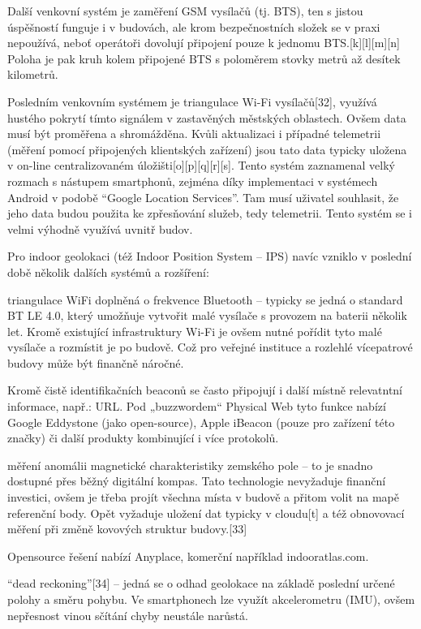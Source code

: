 Další venkovní systém je zaměření GSM vysílačů (tj. BTS), ten s jistou úspěšností funguje i v budovách, ale krom bezpečnostních složek se v praxi nepoužívá, neboť operátoři dovolují připojení pouze k jednomu BTS.[k][l][m][n] Poloha je pak kruh kolem připojené BTS s poloměrem stovky metrů až desítek kilometrů.

Posledním venkovním systémem je triangulace Wi-Fi vysílačů[32], využívá hustého pokrytí tímto signálem v zastavěných městských oblastech. Ovšem data musí být proměřena a shromážděna. Kvůli aktualizaci i případné telemetrii (měření pomocí připojených klientských zařízení) jsou tato data typicky uložena v on-line centralizovaném úložišti[o][p][q][r][s]. Tento systém zaznamenal velký rozmach s nástupem smartphonů, zejména díky implementaci v systémech Android v podobě “Google Location Services”. Tam musí uživatel souhlasit, že jeho data budou použita ke zpřesňování služeb, tedy telemetrii. Tento systém se i velmi výhodně využívá uvnitř budov.

Pro indoor geolokaci (též Indoor Position System – IPS) navíc vzniklo v poslední době několik dalších systémů a rozšíření:

triangulace WiFi doplněná o frekvence Bluetooth – typicky se jedná o standard BT LE 4.0, který umožňuje vytvořit malé vysílače s provozem na baterii několik let. Kromě existující infrastruktury Wi-Fi je ovšem nutné pořídit tyto malé vysílače a rozmístit je po budově. Což pro veřejné instituce a rozlehlé vícepatrové budovy může být finančně náročné. 



Kromě čistě identifikačních beaconů se často připojují i další místně relevatntní informace, např.: URL. Pod „buzzwordem“ Physical Web tyto funkce nabízí Google Eddystone (jako open-source), Apple iBeacon (pouze pro zařízení této značky) či další produkty kombinující i více protokolů.

měření anomálii magnetické charakteristiky zemského pole – to je snadno dostupné přes běžný digitální kompas. Tato technologie nevyžaduje finanční investici, ovšem je třeba projít všechna místa v budově a přitom volit na mapě referenční body. Opět vyžaduje uložení dat typicky v cloudu[t] a též obnovovací měření při změně kovových struktur budovy.[33]



Opensource řešení nabízí Anyplace, komerční například indooratlas.com.

“dead reckoning”[34] – jedná se o odhad geolokace na základě poslední určené polohy a směru pohybu. Ve smartphonech lze využít akcelerometru (IMU), ovšem nepřesnost vinou sčítání chyby neustále narůstá.

